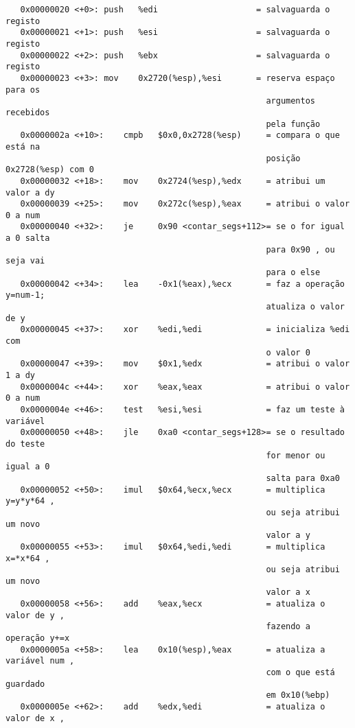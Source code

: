 \documentclass[a4paper, 12pt, portuguese]{article}
\begin{document}
\begin{verbatim}
   0x00000020 <+0>:	push   %edi                    = salvaguarda o registo
   0x00000021 <+1>:	push   %esi                    = salvaguarda o registo
   0x00000022 <+2>:	push   %ebx                    = salvaguarda o registo
   0x00000023 <+3>:	mov    0x2720(%esp),%esi       = reserva espaço para os
                                                     argumentos recebidos
                                                     pela função
   0x0000002a <+10>:	cmpb   $0x0,0x2728(%esp)     = compara o que está na
                                                     posição 0x2728(%esp) com 0
   0x00000032 <+18>:	mov    0x2724(%esp),%edx     = atribui um valor a dy
   0x00000039 <+25>:	mov    0x272c(%esp),%eax     = atribui o valor 0 a num
   0x00000040 <+32>:	je     0x90 <contar_segs+112>= se o for igual a 0 salta
                                                     para 0x90 , ou seja vai
                                                     para o else
   0x00000042 <+34>:	lea    -0x1(%eax),%ecx       = faz a operação y=num-1;
                                                     atualiza o valor de y
   0x00000045 <+37>:	xor    %edi,%edi             = inicializa %edi com
                                                     o valor 0
   0x00000047 <+39>:	mov    $0x1,%edx             = atribui o valor 1 a dy
   0x0000004c <+44>:	xor    %eax,%eax             = atribui o valor 0 a num
   0x0000004e <+46>:	test   %esi,%esi             = faz um teste à variável
   0x00000050 <+48>:	jle    0xa0 <contar_segs+128>= se o resultado do teste
                                                     for menor ou igual a 0
                                                     salta para 0xa0
   0x00000052 <+50>:	imul   $0x64,%ecx,%ecx       = multiplica y=y*y*64 ,
                                                     ou seja atribui um novo
                                                     valor a y
   0x00000055 <+53>:	imul   $0x64,%edi,%edi       = multiplica x=*x*64 ,
                                                     ou seja atribui um novo
                                                     valor a x
   0x00000058 <+56>:	add    %eax,%ecx             = atualiza o valor de y ,
                                                     fazendo a operação y+=x
   0x0000005a <+58>:	lea    0x10(%esp),%eax       = atualiza a variável num ,
                                                     com o que está guardado
                                                     em 0x10(%ebp)
   0x0000005e <+62>:	add    %edx,%edi             = atualiza o valor de x ,

\end{verbatim}
\end{document}
